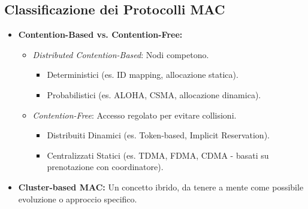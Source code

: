\subsection{Classificazione dei Protocolli MAC}
\begin{itemize}
    \item \textbf{Contention-Based vs. Contention-Free:}
    \begin{itemize}
        \item \textit{Distributed Contention-Based}: Nodi competono.
        \begin{itemize}
            \item Deterministici (es. ID mapping, allocazione statica).
            \item Probabilistici (es. ALOHA, CSMA, allocazione dinamica).
        \end{itemize}
        \item \textit{Contention-Free}: Accesso regolato per evitare collisioni.
        \begin{itemize}
            \item Distribuiti Dinamici (es. Token-based, Implicit Reservation).
            \item Centralizzati Statici (es. TDMA, FDMA, CDMA - basati su prenotazione con coordinatore).
        \end{itemize}
    \end{itemize}
    \item \textbf{Cluster-based MAC:} Un concetto ibrido, da tenere a mente come possibile evoluzione o approccio specifico.
\end{itemize}

